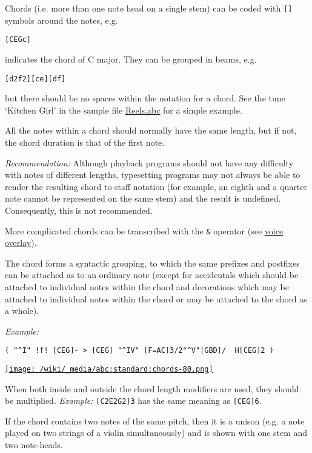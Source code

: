 Chords (i.e. more than one note head on a single stem) can be coded with
\texttt{{[}{]}} symbols around the notes, e.g.

\begin{verbatim}
[CEGc]
\end{verbatim}

indicates the chord of C major. They can be grouped in beams, e.g.

\begin{verbatim}
[d2f2][ce][df]
\end{verbatim}

but there should be no spaces within the notation for a chord. See the
tune `Kitchen Girl' in the sample file
\protect\hyperlink{reelsabc}{Reels.abc} for a simple example.

All the notes within a chord should normally have the same length, but
if not, the chord duration is that of the first note.

\emph{Recommendation:} Although playback programs should not have any
difficulty with notes of different lengths, typesetting programs may not
always be able to render the resulting chord to staff notation (for
example, an eighth and a quarter note cannot be represented on the same
stem) and the result is undefined. Consequently, this is not
recommended.

More complicated chords can be transcribed with the \texttt{\&} operator
(see \protect\hyperlink{voice_overlay}{voice overlay}).

The chord forms a syntactic grouping, to which the same prefixes and
postfixes can be attached as to an ordinary note (except for accidentals
which should be attached to individual notes within the chord and
decorations which may be attached to individual notes within the chord
or may be attached to the chord as a whole).

\emph{Example:}

\begin{verbatim}
( "^I" !f! [CEG]- > [CEG] "^IV" [F=AC]3/2"^V"[GBD]/  H[CEG]2 )
\end{verbatim}

\href{/wiki/_detail/abc:standard:chords-80.png?id=abc\%3Astandard\%3Av2.1}{\texttt{[image: /wiki/\_media/abc:standard:chords-80.png]}}

When both inside and outside the chord length modifiers are used, they
should be multiplied. \emph{Example:} \texttt{{[}C2E2G2{]}3} has the
same meaning as \texttt{{[}CEG{]}6}.

If the chord contains two notes of the same pitch, then it is a unison
(e.g. a note played on two strings of a violin simultaneously) and is
shown with one stem and two note-heads.

